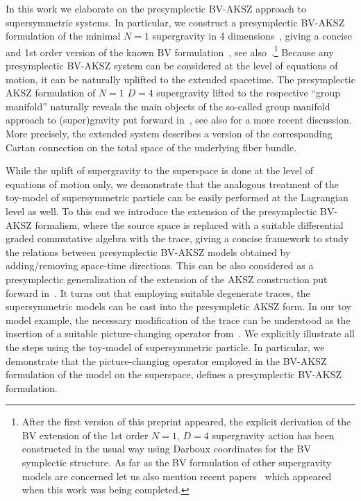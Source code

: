 \documentclass[a4paper,12pt]{article}
\numberwithin{equation}{section} %
\numberwithin{equation}{section}
\begin{document}
In this work we elaborate on the presymplectic BV-AKSZ approach to supersymmetric systems. In particular, we construct a presymplectic BV-AKSZ formulation of the minimal $N=1$ supergravity in 4 dimensions~\cite{Freedman:1976xh}, giving a concise and 1st order version of the known BV formulation~\cite{Baulieu:1990uv}, see also~\cite{Brandt:1996au,Brandt:2002rs,Boulanger:2018fei}.\footnote{
After the first version of this preprint appeared, the explicit derivation of the  BV extension of the 1st order $N=1$, $D=4$ supergravity action has been constructed \cite{Cattaneo:2025wbz} in the usual way using Darboux coordinates for the BV symplectic structure. As far as the BV formulation of other supergravity models are concerned let us also mention recent papers~\cite{Cattaneo:2024sfd,Kupka:2025hln} which appeared when this work was being completed.} Because any presymplectic BV-AKSZ system can be considered at the level of equations of motion, it can be naturally uplifted to the extended spacetime. The presymplectic AKSZ formulation of $N=1$ $D=4$ supergravity lifted to the respective ``group manifold'' naturally reveals the main objects of the so-called group manifold approach to (super)gravity put forward in~\cite{DAuria:1982mkx,Castellani:1991eu}, see also \cite{Fre:2008qw,Castellani:2018zey} for a  more recent discussion. More precisely, the extended system describes a version of the corresponding Cartan connection on the total space of the underlying fiber bundle.

While the uplift of supergravity to the superspace is done at the level of equations of motion only, we demonstrate that the analogous treatment of the toy-model of supersymmetric particle can be easily performed at the Lagrangian level as well. To this end we introduce the extension of the presymplectic BV-AKSZ formalism, where the source space is replaced with a suitable differential graded commutative algebra with the trace, giving a concise framework to study the relations between presymplectic BV-AKSZ models obtained by adding/removing space-time directions. This can be also considered as a presymplectic generalization of the extension of the AKSZ construction put forward in~\cite{Bonechi:2009kx,costello2011renormalization,Bonechi:2022aji}. It turns out that employing suitable degenerate traces, the supersymmetric models can be cast into the presympletic AKSZ form. In our toy model example, the necessary modification of the trace can be understood as the insertion of a suitable picture-changing operator from~\cite{Castellani:2017ycm}. We explicitly illustrate all the steps using the toy-model of supersymmetric particle. In particular, we demonstrate that the picture-changing operator employed in the BV-AKSZ formulation of the model on the superspace, defines a presymplectic BV-AKSZ formulation.
\end{document}
